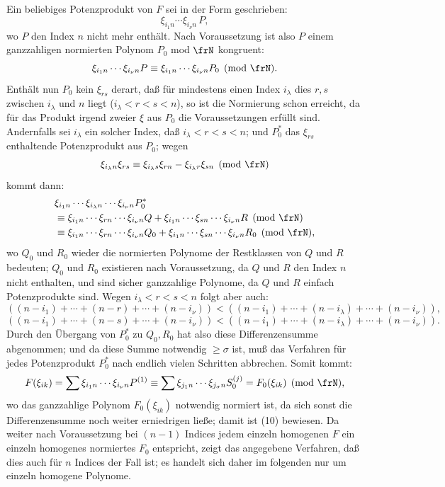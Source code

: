 \documentclass[11pt]{article}
\begin{document}
Ein beliebiges Potenzprodukt von \(F\) sei in der Form geschrieben:
\[
        \xi_{i_1n}\cdots\xi_{i_\nu n}\,P,
\]
wo \(P\) den Index \(n\) nicht mehr enthält. Nach Voraussetzung ist also \(P\) einem ganzzahligen normierten Polynom \(P_0\) mod \(\frN\) kongruent:
\[
        \xi_{i_1n}\cdots\xi_{i_\nu n}P
        \equiv
        \xi_{i_1n}\cdots\xi_{i_\nu n}P_0
        \pmod{\frN}.
\]
Enthält nun \(P_0\) kein \(\xi_{rs}\) derart, daß für mindestens einen Index \(i_\lambda\) dies \(r,s\) zwischen \(i_\lambda\) und \(n\) liegt (\(i_\lambda<r<s<n\)), so ist die Normierung schon erreicht, da für das Produkt irgend zweier \(\xi\) aus \(P_0\) die Voraussetzungen erfüllt sind. Andernfalls sei \(i_\lambda\) ein solcher Index, daß \(i_\lambda<r<s<n\); und \(P_0^*\) das \(\xi_{rs}\) enthaltende Potenzprodukt aus \(P_0\); wegen
\[
        \xi_{i_\lambda n}\xi_{rs}\equiv
        \xi_{i_\lambda s}\xi_{rn}-\xi_{i_\lambda r}\xi_{sn}
        \pmod{\frN}
\]
kommt dann:
\begin{align*}
 &\xi_{i_1n}\cdots\xi_{i_\lambda n}\cdots\xi_{i_\nu n}P_0^*\\
 &\equiv
 \xi_{i_1n}\cdots\xi_{rn}\cdots\xi_{i_\nu n}Q
 +
 \xi_{i_1n}\cdots\xi_{sn}\cdots\xi_{i_\nu n}R
 \pmod{\frN}\\
 &\equiv
 \xi_{i_1n}\cdots\xi_{rn}\cdots\xi_{i_\nu n}Q_0
 +
 \xi_{i_1n}\cdots\xi_{sn}\cdots\xi_{i_\nu n}R_0
 \pmod{\frN},
\end{align*}
wo \(Q_0\) und \(R_0\) wieder die normierten Polynome der Restklassen von \(Q\) und \(R\) bedeuten; \(Q_0\) und \(R_0\) existieren nach Voraussetzung, da \(Q\) und \(R\) den Index \(n\) nicht enthalten, und sind sicher ganzzahlige Polynome, da \(Q\) und \(R\) einfach Potenzprodukte sind. Wegen \(i_\lambda<r<s<n\) folgt aber auch:
\[
 ((n-i_1)+\cdots+(n-r)+\cdots+(n-i_\nu))
 <
 ((n-i_1)+\cdots+(n-i_\lambda)+\cdots+(n-i_\nu)),
\]
\[
 ((n-i_1)+\cdots+(n-s)+\cdots+(n-i_\nu))
 <
 ((n-i_1)+\cdots+(n-i_\lambda)+\cdots+(n-i_\nu)).
\]
Durch den Übergang von \(P_0^*\) zu \(Q_0,R_0\) hat also diese Differenzensumme abgenommen; und da diese Summe notwendig \(\ge \sigma\) ist, muß das Verfahren für jedes Potenzprodukt \(P_0^*\) nach endlich vielen Schritten abbrechen. Somit kommt:
\[
        F(\xi_{ik})
        =
        \sum \xi_{i_1n}\cdots\xi_{i_\nu n}P^{(1)}
        \equiv
        \sum \xi_{j_1n}\cdots\xi_{j_\sigma n}S_0^{(j)}
        =
        F_0(\xi_{ik})\pmod{\frN},
\]
wo das ganzzahlige Polynom \(F_0(\xi_{ik})\) notwendig normiert ist, da sich sonst die Differenzensumme noch weiter erniedrigen ließe; damit ist (10) bewiesen. Da weiter nach Voraussetzung bei \((n-1)\) Indices jedem einzeln homogenen \(F\) ein einzeln homogenes normiertes \(F_0\) entspricht, zeigt das angegebene Verfahren, daß dies auch für \(n\) Indices der Fall ist; es handelt sich daher im folgenden nur um einzeln homogene Polynome.
\end{document}
